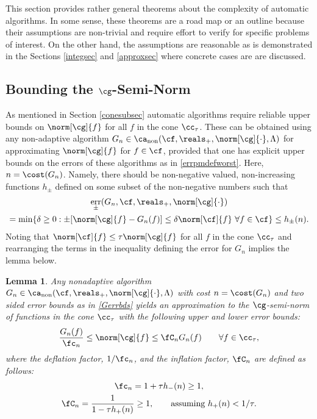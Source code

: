 \documentclass[]{elsarticle}
\DeclareMathOperator{\fix}{non}
\DeclareMathOperator{\err}{err}
\newtheorem{lem}{Lemma}
\theoremstyle{definition}
\theoremstyle{remark}
\begin{document}
This section provides rather general theorems about the complexity of automatic algorithms.  In some sense, these theorems are a road map or an outline because their assumptions are non-trivial and require effort to verify for specific problems of interest.  On the other hand, the assumptions are reasonable as is demonstrated in the Sections \ref{integsec} and \ref{approxsec} where concrete cases are are discussed.  

\subsection{Bounding the $\cg$-Semi-Norm}

As mentioned in Section \ref{conesubsec} automatic algorithms require reliable upper bounds on $\norm[\cg]{f}$ for all $f$ in the cone $\cc_{\tau}$. These can be obtained using any non-adaptive algorithm $G_n \in \ca_{\fix}(\cf,\reals_+,\norm[\cg]{\cdot},\Lambda)$ for approximating $\norm[\cg]{f}$ for $f \in \cf$, provided that one has explicit upper bounds on the errors of these algorithms as in \eqref{errpmdefworst}.  Here, $n=\cost(G_n)$. Namely, there should be non-negative valued, non-increasing functions $h_{\pm}$ defined on some subset of the non-negative numbers such that
\begin{multline} \label{Gerrbds}
\err_{\pm}(G_n,\cf,\reals_{+},\norm[\cg]{\cdot}) \\
= \min\{\delta \ge 0 : \pm [\norm[\cg]{f}- G_n(f)] \le \delta \norm[\cf]{f} \ \forall f \in \cf \} \le h_{ \pm}(n).
\end{multline}
Noting that $\norm[\cf]{f} \le \tau \norm[\cg]{f}$ for all $f$ in the cone $\cc_{\tau}$ and rearranging the terms in the inequality defining the error for $G_n$ implies the lemma below. 

\begin{lem} \label{Gnormlem} Any nonadaptive algorithm $G_n \in \ca_{\fix}(\cf,\reals_+,\norm[\cg]{\cdot},\Lambda)$ with cost $n=\cost(G_n)$ and two sided error bounds as in \eqref{Gerrbds} yields an approximation to the $\cg$-semi-norm of functions in the cone $\cc_{\tau}$ with the following upper and lower error bounds:
\begin{equation} \label{twosidedGineq}
\frac{G_n(f)}{\fc_n} \le \norm[\cg]{f} \le \fC_n G_n(f) \qquad \forall f \in \cc_{\tau},
\end{equation}
where the deflation factor, $1/\fc_n$, and the inflation factor, $\fC_n$ are defined as follows:
\begin{gather} \label{normdeflate}
\fc_n =1 + \tau h_{ -}(n)  \ge 1, \\
\label{norminflate}
\fC_n =\frac{1}{1 - \tau h_{ +}(n)} \ge 1, \qquad \text{assuming } h_{ +}(n) < 1/\tau.
\end{gather}
\end{lem}
\end{document}
